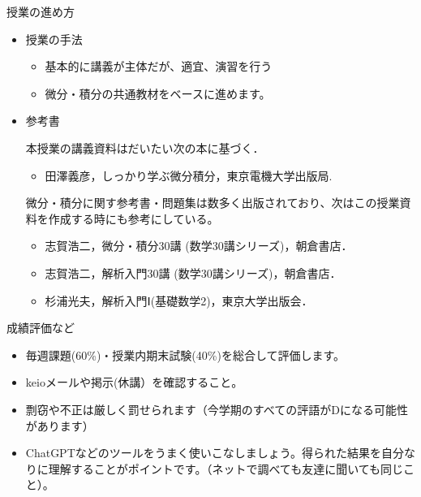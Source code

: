 \begin{slide}{授業の進め方}
\begin{itemize}
\item 授業の手法
\begin{itemize}
\item 基本的に講義が主体だが、適宜、演習を行う
\item 微分・積分の共通教材をベースに進めます。
\end{itemize}

\item 参考書

本授業の講義資料はだいたい次の本に基づく．
\begin{itemize}
\item 田澤義彦，しっかり学ぶ微分積分，東京電機大学出版局.
\end{itemize}
微分・積分に関す参考書・問題集は数多く出版されており、次はこの授業資料を作成する時にも参考にしている。
\begin{itemize}
\item 志賀浩二，微分・積分30講 (数学30講シリーズ)，朝倉書店．
\item 志賀浩二，解析入門30講 (数学30講シリーズ)，朝倉書店．
\item 杉浦光夫，解析入門Ⅰ(基礎数学2)，東京大学出版会．
\end{itemize}
\end{itemize}
\end{slide}

\begin{slide}{成績評価など}
\begin{itemize}
\item 毎週課題(60\%)・授業内期末試験(40\%)を総合して評価します。
\item keioメールや掲示(休講）を確認すること。
\item 剽窃や不正は厳しく罰せられます（今学期のすべての評語がDになる可能性があります）
\item ChatGPTなどのツールをうまく使いこなしましょう。得られた結果を自分なりに理解することがポイントです。（ネットで調べても友達に聞いても同じこと）。
\end{itemize}
\end{slide}

